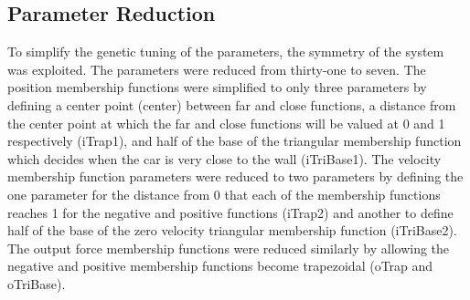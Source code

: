 \documentclass[submit]{aiaa-tc}%
\begin{document}
\subsection{Parameter Reduction}
To simplify the genetic tuning of the parameters, the symmetry of the system was exploited. The parameters were reduced from thirty-one to seven. The position membership functions were simplified to only three parameters by defining a center point (center) between far and close functions, a distance from the center point at which the far and close functions will be valued at 0 and 1 respectively (iTrap1), and half of the base of the triangular membership function which decides when the car is very close to the wall (iTriBase1). The velocity membership function parameters were reduced to two parameters by defining the one parameter for the distance from 0 that each of the membership functions reaches 1 for the negative and positive functions (iTrap2) and another to define half of the base of the zero velocity triangular membership function (iTriBase2). The output force membership functions were reduced similarly by allowing the negative and positive membership functions become trapezoidal (oTrap and oTriBase). 
\end{document}
